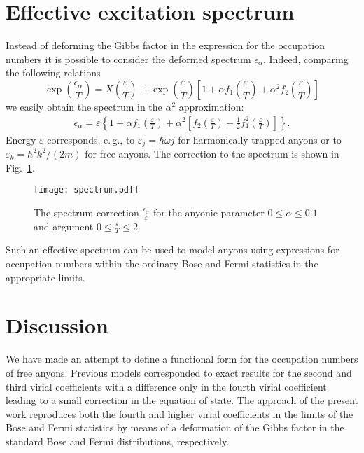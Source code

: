 \documentclass[12pt,a4paper]{article}
\def\eps{\varepsilon}
\def\ds{\displaystyle}
\begin{document}
{\section{Effective excitation spectrum}\label{sec:spectrum}
Instead of deforming the Gibbs factor in the expression for the occupation numbers it is possible to consider the deformed spectrum $\epsilon_{\alpha}$. Indeed, comparing the following relations
\begin{equation}
\exp\left(\frac{\epsilon_\alpha}{T}\right) = 
X\left(\frac{\eps}{T}\right)
\equiv \exp\left(\frac{\eps}{T}\right) 
\left[
1+ \alpha f_1 \left(\frac{\eps}{T}\right) 
+ \alpha^2 f_2 \left(\frac{\eps}{T}\right) 
\right]
\end{equation}
we easily obtain the spectrum in the $\alpha^2$ approximation:
\begin{align}
\epsilon_{\alpha} = \eps\left\{
1+\alpha f_1 \left(\frac{\eps}{T}\right) 
+\alpha^2 \left[ f_2\left(\frac{\eps}{T}\right)- 
\frac12 f_1^2 \left(\frac{\eps}{T}\right)
\right]
\right\}.
\end{align}
Energy $\eps$ corresponds, e.\,g., to $\eps_j=\hbar\omega j$ for harmonically trapped anyons or to $\eps_k=\hbar^2k^2/(2m)$ for free anyons. The correction to the spectrum is shown in Fig.~\ref{fig:spectrum}.

\begin{figure}[h]
\centerline{\texttt{[image: spectrum.pdf]}}
\caption{The spectrum correction $\ds\frac{\epsilon_\alpha}{\eps}$ for the anyonic parameter $0\leq\alpha\leq0.1$ and argument $\ds0\leq\frac{\eps}{T}\leq2$.
}\label{fig:spectrum}
\end{figure}

Such an effective spectrum can be used to model anyons using expressions for occupation numbers within the ordinary Bose and Fermi statistics in the appropriate limits.



\section{Discussion}\label{sec:discussion}
We have made an attempt to define a functional form for the occupation numbers of free anyons. Previous models corresponded to exact results for the second and third virial coefficients with a difference only in the fourth virial coefficient leading to a small correction in the equation of state. The approach of the present work reproduces both the fourth and higher virial coefficients in the limits of the Bose and Fermi statistics by means of a deformation of the Gibbs factor in the standard Bose  and Fermi distributions, respectively.

}
\end{document}
